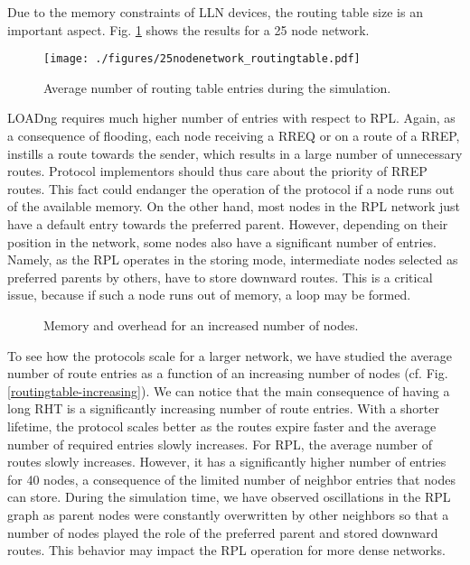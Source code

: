 \documentclass[conference,10pt,a4paper]{IEEEtran}
\begin{document}
Due to the memory constraints of LLN devices, the routing table size is an
important aspect. Fig. \ref{routingtable} shows the results for a 25 node network.

\begin{figure}[htbp]
\centering
\texttt{[image: ./figures/25nodenetwork\_routingtable.pdf]}
\caption{Average number of routing table entries during the simulation.}
\label{routingtable}
\end{figure}

LOADng requires much higher number of entries with respect to
RPL. Again, as a consequence of flooding, each node receiving a RREQ or on a
route of a RREP, instills a route towards the sender, which results in a
large number of unnecessary routes. Protocol implementors should thus care
about the priority of RREP routes. This fact could endanger the operation of
the protocol if a node runs out of the available memory. On the other hand, most
nodes in the RPL network just have a default entry towards the preferred
parent. However, depending on their position in the network, some nodes also
have a significant number of entries. Namely, as the RPL operates in the
storing mode, intermediate nodes  selected as preferred parents by
others, have to store downward routes. This is a critical issue, because if
such a node runs out of memory, a loop may be
formed. 



\begin{figure}[htbp]
\centering
{}
\caption{Memory and overhead for an increased number of nodes.}
\end{figure}

To see how the protocols scale for a larger network, we have studied
the average number of route entries as a function of an increasing number of
nodes (cf. Fig.
\ref{routingtable-increasing}). 
We can notice that the main consequence of having a long RHT
is a significantly increasing number of route entries. With
a shorter lifetime, the protocol scales better as the routes expire faster and
the average number of required entries slowly increases. For RPL, the average
number of routes slowly increases. 
However, it has a significantly higher number of entries for 40 nodes, a
consequence of the limited number of neighbor entries that nodes can
store. During the simulation time, we have observed oscillations in the RPL
graph as parent nodes were constantly overwritten by other neighbors so that a
number of nodes played the role of the preferred parent and stored downward
routes. This behavior may impact the RPL operation for more dense networks.  
\end{document}
